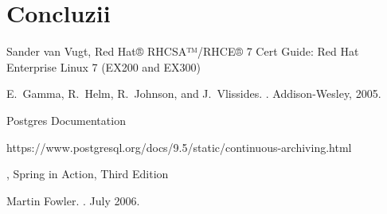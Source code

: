 \documentclass[12, twoside]{report}
\begin{document}
\chapter*{Concluzii}


%

\begin{thebibliography}{10}

\newblock Sander van Vugt,
\newblock Red Hat® RHCSA™/RHCE® 7 Cert Guide: Red Hat Enterprise Linux 7 (EX200 and EX300)

E.~Gamma, R.~Helm, R.~Johnson, and J.~Vlissides.
.
\newblock Addison-Wesley, 2005.

Postgres Documentation
\par
\newblock https://www.postgresql.org/docs/9.5/static/continuous-archiving.html

,
\newblock Spring in Action, Third Edition

Martin Fowler.
.
 July 2006.

\end{thebibliography}

\end{document}
